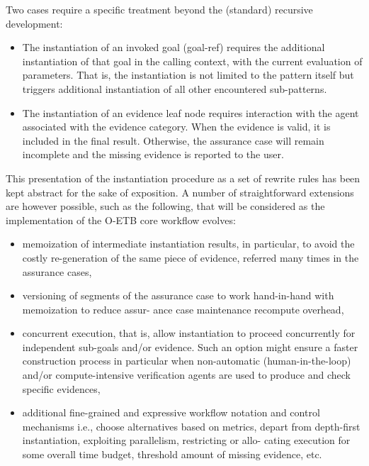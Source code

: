 \documentclass[12pt,twoside,a4paper]{article}
\begin{document}
Two cases require a specific treatment beyond the (standard) recursive development:

\begin{itemize}
\item
  The instantiation of an invoked goal (goal-ref) requires the additional instantiation of that goal in the calling context, with the current evaluation of parameters. That is, the instantiation is not limited to the pattern itself but triggers additional instantiation of all other encountered sub-patterns.
\item
  The instantiation of an evidence leaf node requires interaction with the agent associated with the evidence category. When the evidence is valid, it is included in the final result. Otherwise, the assurance case will remain incomplete and the missing evidence is reported to the user.
\end{itemize}

This presentation of the instantiation procedure as a set of rewrite rules has been kept abstract for the sake of exposition. A number of straightforward extensions are however possible, such as the following, that will be considered as the implementation of the O-ETB core workflow evolves:

\begin{itemize}
\item
  memoization of intermediate instantiation results, in particular, to avoid the costly re-generation of the same piece of evidence, referred many times in the assurance cases,
\item
  versioning of segments of the assurance case to work hand-in-hand with memoization to reduce assur- ance case maintenance recompute overhead,
\item
  concurrent execution, that is, allow instantiation to proceed concurrently for independent sub-goals and/or evidence. Such an option might ensure a faster construction process in particular when non-automatic (human-in-the-loop) and/or compute-intensive verification agents are used to produce and check specific evidences,
\item
  additional fine-grained and expressive workflow notation and control mechanisms i.e., choose alternatives based on metrics, depart from depth-first instantiation, exploiting parallelism, restricting or allo- cating execution for some overall time budget, threshold amount of missing evidence, etc.
\end{itemize}
\end{document}
